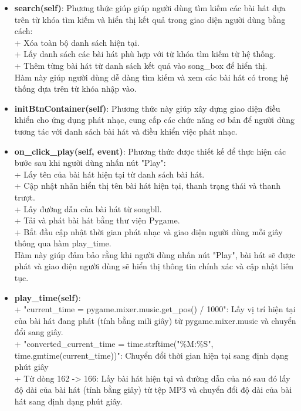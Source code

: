 \documentclass[a4paper]{article}
\begin{document}
\begin{itemize}
    \item \textbf{search(self)}: Phương thức giúp giúp người dùng tìm kiếm các bài hát dựa trên từ khóa tìm kiếm và hiển thị kết quả trong giao diện người dùng bằng cách: \\
    + Xóa toàn bộ danh sách hiện tại. \\
    + Lấy danh sách các bài hát phù hợp với từ khóa tìm kiếm từ hệ thống. \\
    + Thêm từng bài hát từ danh sách kết quả vào song\_box để hiển thị. \\
    Hàm này giúp người dùng dễ dàng tìm kiếm và xem các bài hát có trong hệ thống dựa trên từ khóa nhập vào.
    \item \textbf{initBtnContainer(self)}: Phương thức này giúp xây dựng giao diện điều khiển cho ứng dụng phát nhạc, cung cấp các chức năng cơ bản để người dùng tương tác với danh sách bài hát và điều khiển việc phát nhạc.
    \item \textbf{on\_click\_play(self, event)}: Phương thức được thiết kế để thực hiện các bước sau khi người dùng nhấn nút "Play": \\
    + Lấy tên của bài hát hiện tại từ danh sách bài hát. \\
    + Cập nhật nhãn hiển thị tên bài hát hiện tại, thanh trạng thái và thanh trượt. \\
    + Lấy đường dẫn của bài hát từ songbll. \\
    + Tải và phát bài hát bằng thư viện Pygame. \\
    + Bắt đầu cập nhật thời gian phát nhạc và giao diện người dùng mỗi giây thông qua hàm play\_time. \\
    Hàm này giúp đảm bảo rằng khi người dùng nhấn nút "Play", bài hát sẽ được phát và giao diện người dùng sẽ hiển thị thông tin chính xác và cập nhật liên tục.
    \item \textbf{play\_time(self)}: \\
    + "current\_time = pygame.mixer.music.get\_pos() / 1000": Lấy vị trí hiện tại của bài hát đang phát (tính bằng mili giây) từ pygame.mixer.music và chuyển đổi sang giây. \\
    + "converted\_current\_time = time.strftime("\%M:\%S", time.gmtime(current\_time))": Chuyển đổi thời gian hiện tại sang định dạng phút giây \\
    + Từ dòng 162 -> 166: Lấy bài hát hiện tại và đường dẫn của nó sau đó lấy độ dài của bài hát (tính bằng giây) từ tệp MP3 và chuyển đổi độ dài của bài hát sang định dạng phút giây. \\

\end{itemize}
\end{document}
